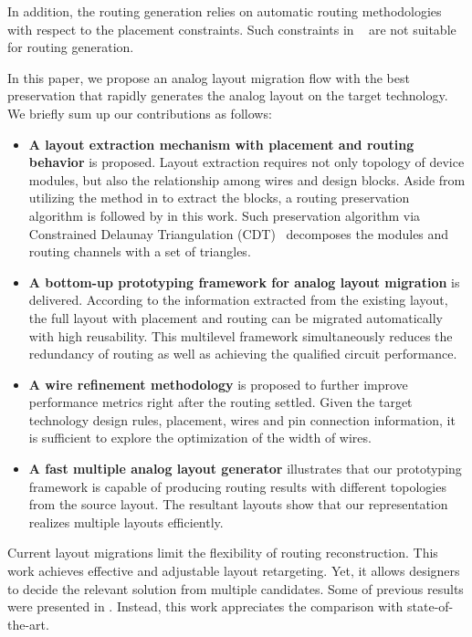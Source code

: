   In addition, the routing generation relies on automatic routing methodologies with respect to the placement constraints. Such constraints in ~\cite{cbc-bhattacharya-dac04,Bhattacharya_ASPDAC04,msc-bhattacharya-tcad06,Zhang_TCAD08,Wang_ALRGP_TODAES2011} are not suitable for routing generation. 

  In this paper, we propose an analog layout migration flow with the best preservation that rapidly generates the analog layout on the target technology. We briefly sum up our contributions as follows:

  \begin{itemize}
    \item {\bf A layout extraction mechanism with placement and routing behavior} is proposed. Layout extraction requires not only topology of device modules, but also the relationship among wires and design blocks. Aside from utilizing the method in \cite{ALP_YPWeng_iccad2011} to extract the blocks, a routing preservation algorithm is followed by in this work. Such preservation algorithm via Constrained Delaunay Triangulation (CDT)~\cite{Shewchuk200221} decomposes the modules and routing channels with a set of triangles.  
    \item {\bf A bottom-up prototyping framework for analog layout migration} is delivered. According to the information extracted from the existing layout, the full layout with placement and routing can be migrated automatically with high reusability. This multilevel framework simultaneously reduces the redundancy of routing as well as achieving the qualified circuit performance.
    \item {\bf A wire refinement methodology} is proposed to further improve performance metrics right after the routing settled. Given the target technology design rules, placement, wires and pin connection information, it is sufficient to explore the optimization of the width of wires.
    \item {\bf A fast multiple analog layout generator} illustrates that our prototyping framework is capable of producing routing results with different topologies from the source layout. The resultant layouts show that our representation realizes multiple layouts efficiently.
  \end{itemize}

  Current layout migrations limit the flexibility of routing reconstruction. This work achieves effective and adjustable layout retargeting. Yet, it allows designers to decide the relevant solution from multiple candidates. Some of previous results were presented in \cite{Chin_DMR_ICCAD2013}. Instead, this work appreciates the comparison with state-of-the-art.

